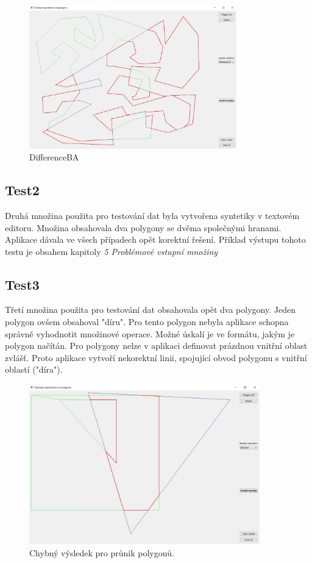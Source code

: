 \documentclass[a4paper, 12pt]{article}
\begin{document}
 \begin{figure}[h!]
	\centering
	\includegraphics[width=9cm]{t4.jpg}
	\caption{DifferenceBA}
\end{figure}

\clearpage

\subsection{Test2}
Druhá množina použita pro testování dat byla vytvořena syntetiky v textovém editoru. Množina obsahovala dva polygony se dvěma společnými hranami. Aplikace dávala ve všech případech opět korektní řešení. Příklad výstupu tohoto testu je obsahem kapitoly \textit{5 Problémové vstupní množiny} 

\subsection{Test3}
Třetí množina použita pro testování dat obsahovala opět dva polygony. Jeden polygon ovšem obsahoval "díru". Pro tento polygon nebyla aplikace schopna správně vyhodnotit množinové operace. Možné úskalí je ve formátu, jakým je polygon načítán. Pro polygony nelze v aplikaci definovat prázdnou vnitřní oblast zvlášť. Proto aplikace vytvoří nekorektní linii, spojující obvod polygonu s vnitřní oblastí ("díra").

 \begin{figure}[h!]
	\centering
	\includegraphics[width=10cm]{t5.jpg}
	\caption{Chybný výsledek pro průnik polygonů.}
\end{figure}
\end{document}
